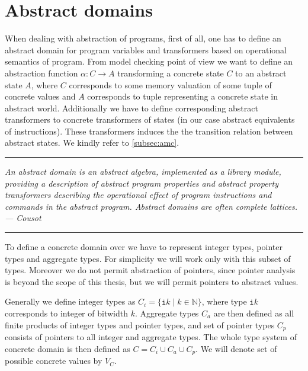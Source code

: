 
\section{Abstract domains} \label{sec:absdom}

When dealing with abstraction of programs, first of all, one has to define an
abstract domain for program variables and transformers based on operational
semantics of program. From model checking point of view we want to define an
abstraction function $\alpha \colon C \to A$ transforming a concrete
state $C$ to an abstract state $A$, where $C$ corresponds to some memory
valuation of some tuple of concrete values and $A$ corresponds to tuple
representing a concrete state in abstract world.  Additionally we have to define
corresponding abstract transformers to concrete transformers of states (in our
case abstract equivalents of \LLVM instructions). These transformers induces the
the transition relation between abstract states. We kindly refer to
\autoref{subsec:amc}.

\bigskip

\hrule

\bigskip
\noindent
\textit{An abstract domain is an abstract algebra, implemented as a library module,
providing a description of abstract program properties and abstract property
transformers describing the operational effect of program instructions and
commands in the abstract program. Abstract domains are often complete lattices. --- Cousot \cite{Cousot79} }
\bigskip

\hrule

\bigskip

To define a concrete domain over \LLVM we have to represent integer types,
pointer types and aggregate types. For simplicity we will work only with this
subset of \LLVM types. Moreover we do not permit abstraction of pointers, since
pointer analysis is beyond the scope of this thesis, but we will permit
pointers to abstract values.

Generally we define integer types as $C_{i} = \{ \texttt{i}k \mid k
\in \mathbb{N} \}$, where type $\texttt{i}k$ corresponds to integer of bitwidth $k$.
Aggregate types $C_a$ are then defined as all finite products of integer types and
pointer types, and set of pointer types $C_p$ consists of pointers to all integer
and aggregate types. The whole type system of concrete domain is
then defined as $C = C_i \cup C_a \cup C_p$. We will denote set of possible
concrete values by $V_C$.

